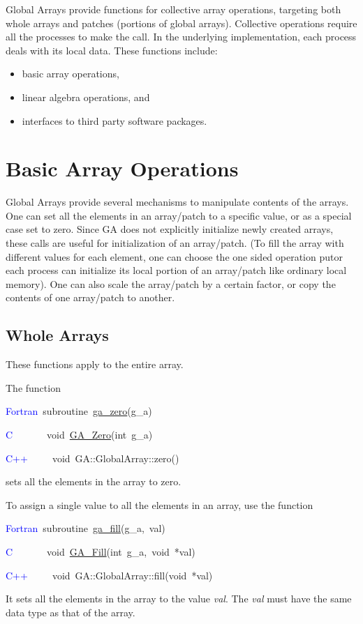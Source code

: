 Global Arrays provide functions for collective array operations, targeting
both whole arrays and patches (portions of global arrays). Collective
operations require all the processes to make the call. In the underlying
implementation, each process deals with its local data. These functions
include:
\begin{itemize}
\item basic array operations, 
\item linear algebra operations, and 
\item interfaces to third party software packages.
\end{itemize}

\section{Basic Array Operations }

Global Arrays provide several mechanisms to manipulate contents of
the arrays. One can set all the elements in an array/patch to a specific
value, or as a special case set to zero. Since GA does not explicitly
initialize newly created arrays, these calls are useful for initialization
of an array/patch. (To fill the array with different values for each
element, one can choose the one sided operation putor each process
can initialize its local portion of an array/patch like ordinary local
memory). One can also scale the array/patch by a certain factor, or
copy the contents of one array/patch to another. 


\subsection{Whole Arrays }

These functions apply to the entire array.

The function
\begin{lyxcode}
\textcolor{blue}{Fortran}~subroutine~\href{http://www.emsl.pnl.gov/docs/global/ga_ops.html\#ga_zero}{ga\_{}zero}(g\_a)~

\textcolor{blue}{C}~~~~~~~void~\href{http://www.emsl.pnl.gov/docs/global/c_nga_ops.html\#ga_zero}{GA\_{}Zero}(int~g\_a)~

\textcolor{blue}{C++}~~~~~void~GA::GlobalArray::zero()
\end{lyxcode}
sets all the elements in the array to zero.

To assign a single value to all the elements in an array, use the
function
\begin{lyxcode}
\textcolor{blue}{Fortran}~subroutine~\href{http://www.emsl.pnl.gov/docs/global/ga_ops.html\#ga_fill}{ga\_{}fill}(g\_a,~val)~

\textcolor{blue}{C}~~~~~~~void~\href{http://www.emsl.pnl.gov/docs/global/c_nga_ops.html\#ga_fill}{GA\_{}Fill}(int~g\_a,~void~{*}val)~

\textcolor{blue}{C++}~~~~~void~GA::GlobalArray::fill(void~{*}val)
\end{lyxcode}
It sets all the elements in the array to the value \emph{val}. The
\emph{val} must have the same data type as that of the array.

